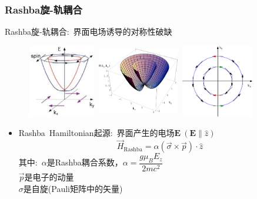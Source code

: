 {\frame
{
	\frametitle{\textrm{Rashba}旋-轨耦合}
	\textrm{Rashba}旋-轨耦合:~界面电场诱导的对称性破缺
\begin{figure}[h!]
\centering
\vspace*{+0.05in}
\includegraphics[height=1.25in,width=1.20in,viewport=0 0 700 760,clip]{Figures/SOC_Rashba_effect.png}
\includegraphics[height=1.25in,width=1.40in,viewport=0 0 750 600,clip]{Figures/SOC_Rashba-1.png}
\includegraphics[height=1.25in,width=1.30in,viewport=0 0 650 590,clip]{Figures/SOC_Rashba-2.png}
\label{Rashba_effect}
\end{figure}

	\begin{itemize}
	\item \textrm{Rashba~Hamiltonian}起源:~界面产生的电场$\mathbf E~(\mathbf E\parallel \hat z)$%
		\begin{displaymath}
			\vec H_{\mathrm{Rashba}}=\alpha(\vec\sigma\times\vec p)\cdot\hat z
		\end{displaymath}
		其中:~$\alpha$是\textrm{Rashba}耦合系数，$\alpha=\dfrac{g\mu_BE_z}{2mc^2}$\\
		$\vec p$是电子的动量\\
		$\sigma$是自旋(\textrm{Pauli}矩阵中的矢量)
	\end{itemize}
}

}
